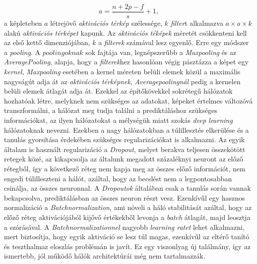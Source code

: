 \documentclass[12pt,letterpaper,twoside,openright]{book}
\begin{document}
\begin{equation}
a = \frac{n+2p-f}{s} +1,
\end{equation}
a képleteben $a$ létrejövő \textit{aktivációs térkép} szélessége, $k$ \textit{filter}t alkalmazva $a\times a\times k$ alakú \textit{aktivációs térképet} kapunk. Az \textit{aktivációs téképek} méretét csökkenteni kell az első kettő dimenziójában, $k$ a \textit{filterek} számával lesz egyenlő. Erre egy módszer a \textit{pooling}. A $poolingoknak$ sok fajtája van, legnépszerűbb a \textit{Maxpooling} és az \textit{AveragePooling}, alapja, hogy a \textit{filterek}hez hasonlóan végig pásztázza a képet egy \textit{kernel},  \textit{Maxpooling} esetében a kernel méreten belüli elemek közül a maximális nagyságút adja át az \textit{aktivációs térképnek}, \textit{Averagepoolingnál} pedig a kernelen belüli elemek átlagát adja át. 
\newline\indent
Ezekkel az építőkövekkel sokrétegű hálózatok hozhatóak létre, melyknek nem szükséges az adatokat, képeket értelmes változóvá transzformálni, a hálózat meg tudja találni a prediktáláshoz szükséges információkat, az ilyen hálózatokat a mélységük miatt szokás \textit{deep learning} hálózatoknak nevezni. Ezekben a nagy hálózatokban a túlillesztés elkerülése és a tanulás gyorsítása érdekében szükséges regularizációkat is alkalmazni. Az egyik általam is használt regularizáció a \textit{Dropout}, melyet berakva teljesen összekötött retegek közé, az kikapcsolja az általunk megadott százaléknyi neuront az előző rétegből, így a következő réteg nem kapja meg az összes előző információt, nem engedi túlilleszteni a hálót, azáltal, hogy az becslést nem a legpontosabban csinálja, az összes neuronnal. A \textit{Dropoutok} általában csak a tanulás során vannak bekapcsolva, prediktálásban az összes neuron részt vesz. Ezenkívűl egy hasznos normalizáció a \textit{Batchnormalization}, ami növeli a háló stabilitását azáltal, hogy az előző réteg aktivációjából kijővő értékekből levonja a \textit{batch} átlagát, majd leosztja a szórásával. A \textit{Batchnormalizationnel} nagyobb \textit{learning ratet} lehet alkalmazni, mert biztosítja, hogy egyik aktiváció se lesz túl magas, ezenkívűl az eltérő tanító és teszthalmaz eloszlás problémán is javít. Ez egy viszonlyag új találmány, így az ismertebb, jól működő hálók architektúrái még nem tartalmazzák.
\end{document}
